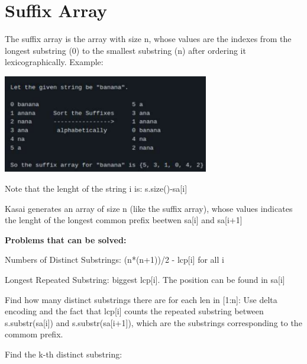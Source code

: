 
\section{Suffix Array} 

    The suffix array is the array with size n, whose values are the indexes 
    from the longest substring (0) to the smallest substring (n) after ordering it lexicographically. 
    Example:
    
    \begin{center}
    \includegraphics[width=90mm]{content/strings/suffix-array.pdf}
    \end{center}

    Note that the lenght of the string i is: {s.size()-sa[i]}


    Kasai generates an array of size n (like the suffix array), 
    whose values indicates the lenght of the longest common prefix beetwen sa[i] and sa[i+1]


    \textbf{Problems that can be solved:}

    Numbers of Distinct Substrings: (n*(n+1))/2 - lcp[i] {for all i}

    Longest Repeated Substring: biggest lcp[i]. The position can be found in sa[i]

    Find how many distinct substrings there are for each len in [1:n]: Use delta encoding and the fact that lcp[i] counts the repeated substring between s.substr(sa[i]) and s.substr(sa[i+1]), which are the substrings corresponding to the commom prefix.

    Find the k-th distinct substring: 

    



